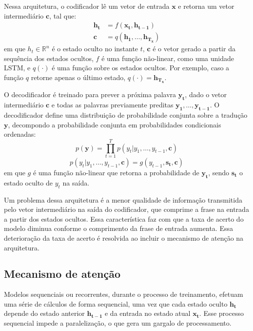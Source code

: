Nessa arquitetura, o codificador lê um vetor de entrada $\mathbf{x}$ e retorna
um vetor intermediário $\mathbf{c}$, tal que:   
\begin{align}
    \mathbf{h_t} &= f(\mathbf{x_t}, \mathbf{h_{t-1}}) \\
    \mathbf{c} &= q(\mathbf{h_1}, \ldots, \mathbf{h_{T_x}})
\end{align}
em que $h_t \in \mathbb{R}^n$ é o estado oculto no instante $t$, $\mathbf{c}$ é o vetor
gerado a partir da sequência dos estados ocultos, $f$ é uma função não-linear,
como uma unidade LSTM, e $q(\cdot)$ é uma função sobre os estados ocultos. Por
exemplo, caso a função $q$ retorne apenas o último estado, $q(\cdot) =
\mathbf{h_{T_x}}$.

O decodificador é treinado para prever a próxima palavra $\mathbf{y_t}$, dado o
vetor intermediário $\mathbf{c}$ e todas as palavras previamente preditas
$\mathbf{y_1}, \ldots, \mathbf{y_{t-1}}$. O decodificador define uma
distribuição de probabilidade conjunta sobre a tradução $\mathbf{y}$, decompondo
a probabilidade conjunta em probabilidades condicionais ordenadas:
\begin{equation}
    p(\mathbf{y}) = \prod_{t=1}^T p(y_t | y_1, \ldots, y_{t-1}, \mathbf{c})
\end{equation}
\begin{equation}
    p(y_t | y_1, \ldots, y_{t-1}, \mathbf{c}) = g(y_{t-1}, \mathbf{s_t}, \mathbf{c})
\end{equation}
em que $g$ é uma função não-linear que retorna a probabilidade de
$\mathbf{y_t}$, sendo $\mathbf{s_t}$ o estado oculto de $y_t$ na saída.

Um problema dessa arquitetura é a menor qualidade de informação transmitida pelo
vetor intermediário na saída do codificador, que comprime a frase na entrada a
partir dos estados ocultos. Essa característica faz com que a taxa de acerto do
modelo diminua conforme o comprimento da frase de entrada aumenta. Essa
deterioração da taxa de acerto é resolvida ao incluir o mecanismo de atenção
na arquitetura.

\subsection{Mecanismo de atenção}
Modelos sequenciais ou recorrentes, durante o processo de treinamento, efetuam
uma série de cálculos de forma sequencial, uma vez que cada estado oculto
$\mathbf{h_t}$ depende do estado anterior $\mathbf{h_{t-1}}$ e da entrada no
estado atual $\mathbf{x_t}$. Esse processo sequencial impede a paralelização, o
que gera um gargalo de processamento.

